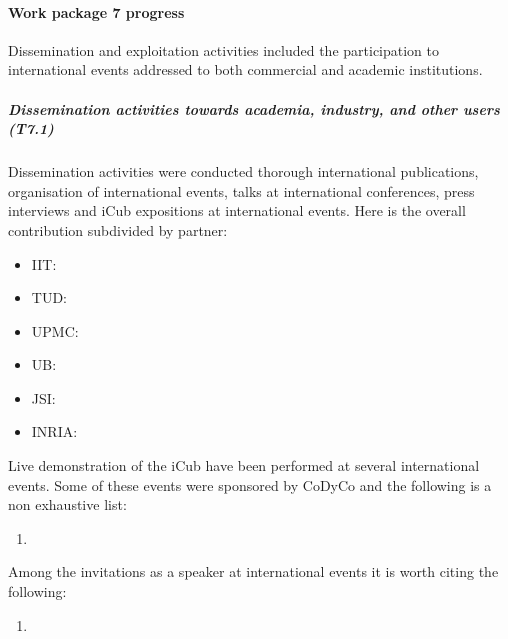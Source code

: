 

\paragraph{Work package 7 progress}

Dissemination and exploitation activities included the participation to international events addressed to both commercial and academic institutions. 

\subparagraph{Dissemination activities towards academia, industry, and other users (T7.1)}

Dissemination activities were conducted thorough international publications, organisation of international events, talks at international conferences, press interviews and iCub expositions at international events. Here is the overall contribution subdivided by partner:

\begin{itemize}

\item IIT: 

\item TUD: 

\item UPMC: 

\item UB: 

\item JSI: 

\item INRIA: 

\end{itemize}

Live demonstration of the iCub have been performed at several international events.  Some of these events were sponsored by CoDyCo and the following is a non exhaustive list:

\begin{enumerate}

\item 

\end{enumerate} 

Among the invitations as a speaker at international events it is worth citing the following:

\begin{enumerate}

\item 

\end{enumerate} 

